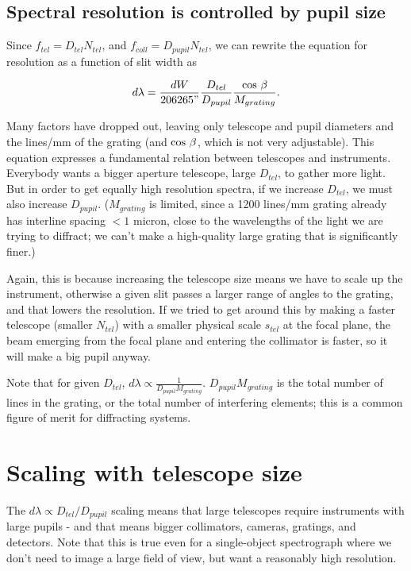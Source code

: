 \documentclass[12pt]{article}
\begin{document}
\subsection{Spectral resolution is controlled by pupil size}

Since $f_{tel} = D_{tel} N_{tel}$, and $f_{coll} = D_{pupil}  N_{tel}$,
we can rewrite the equation for resolution as a function of 
slit width as

$$ d\lambda = \frac{dW}{206265"}  \frac{D_{tel}}{D_{pupil}} \frac{{\rm cos}~\beta}{M_{grating}}. $$

Many factors have dropped out, leaving only telescope and
pupil diameters and the lines/mm of the grating (and ${\rm cos}~\beta$,
which is not very adjustable).
This equation expresses a fundamental relation between telescopes
and instruments.
Everybody wants a bigger aperture telescope, large $D_{tel}$, to
gather more light.  But in order to get equally
high resolution spectra, if we increase $D_{tel}$,
we must also increase $D_{pupil}$.  ($M_{grating}$ is limited, since a 
1200 lines/mm grating already has interline spacing $<1$ micron,
close to the wavelengths of the light we are trying to diffract;
we can't make a high-quality large grating that is significantly finer.)

Again, this is because increasing the telescope size
means we have to scale up the instrument, otherwise a given
slit passes a larger range of angles to the grating, and that
lowers the resolution.  If we tried to get around this by
making a faster telescope (smaller $N_{tel}$) with a smaller physical 
scale $s_{tel}$ at the focal plane, the beam emerging from the focal 
plane and entering the collimator is faster, so it will make a
big pupil anyway.

Note that for given $D_{tel}$,
$d\lambda \propto \frac{1}{D_{pupil} M_{grating}}$.  
$D_{pupil} M_{grating}$ is the total number of lines in the grating,
or the total number of interfering elements; this is a common
figure of merit for diffracting systems.

\section{Scaling with telescope size}

The $d\lambda \propto D_{tel}/D_{pupil}$ scaling means that large telescopes 
require 
instruments with large pupils - and that means bigger collimators, 
cameras, gratings, and detectors.  Note that this is true even for a
single-object spectrograph where we don't need to image a large field
of view, but want a reasonably high resolution.  
\end{document}

